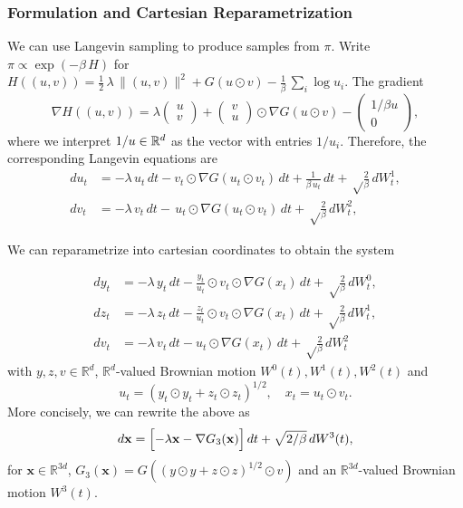\documentclass{article}
\renewcommand{\vec}[1]{{\mathbf{#1}}}
\begin{document}
\subsubsection{Formulation and Cartesian Reparametrization}
We can use Langevin sampling to produce samples from $\pi$. Write $\pi\propto\exp(-\beta\, H)$ for $H((u,v))=\frac 12 \,\lambda\, \|(u,v)\|^2 + G(u\odot v)- \frac{1}{\beta}\,\sum_i\log u_i$. The gradient
\[
\nabla H((u,v))=\lambda\begin{pmatrix}
    u\\v
\end{pmatrix}
+\begin{pmatrix}
    v\\ u
\end{pmatrix}\odot \nabla G(u\odot v)
-\begin{pmatrix}
    1/\beta u\\ 0
\end{pmatrix},
\]
where we interpret $1/u\in\mathbb{R}^d$ as the vector with entries $1/u_i$. Therefore, the corresponding Langevin equations are 
\begin{equation} \label{uvproc}
\begin{split}
du_t&=-\lambda\,   u_t\,dt - v_t\odot \nabla G(u_t\odot v_t)\,dt
 +\frac{1}{\beta \,u_t}\,dt+ \sqrt\frac{2}{\beta}\,dW^1_t,\\
dv_t&=-\lambda\,  v_t\,dt -  \,u_t \odot \nabla G(u_t\odot v_t)\,dt+  \sqrt\frac{2}{\beta}\,dW^2_t,
\label{uvproc}
\end{split}
\end{equation}

We can reparametrize into cartesian coordinates to obtain the system

\begin{equation} 
\begin{split} 
dy_t&=-\lambda\,   y_t\,dt - \frac{y_t}{u_t} \odot v_t\odot \nabla G(x_t)\,dt
 +\sqrt\frac{2}{\beta}\,dW^0_t,\\
dz_t&=-\lambda\,   z_t\,dt - \frac{z_t}{u_t} \odot v_t\odot \nabla G(x_t)\,dt
 +\sqrt\frac{2}{\beta}\,dW^1_t,\\
dv_t&=-\lambda\,   v_t\,dt - u_t\odot \nabla G(x_t)\,dt
 +\sqrt\frac{2}{\beta}\,dW^2_t
\label{yzvproc}
\end{split}
\end{equation}
with $y,z,v \in \mathbb{R}^d$, $\mathbb{R}^{d}$-valued Brownian motion $W^0(t), W^1(t), W^2(t)$ and
\[u_t = (y_t \odot y_t + z_t \odot z_t)^{1/2}, \quad x_t = u_t \odot v_t.\]
More concisely, we can rewrite the above as 
\begin{equation}  
 \begin{aligned}
 d\vec x= \Bigl[-\lambda \vec x - \nabla G_{3}(\vec x)\Bigr]\,dt +\sqrt{2/\beta}\, dW^3(t),
  \end{aligned}\label{cyl}
\end{equation}
for $\vec x \in \mathbb{R}^{3d}$, $G_{3}(\vec x)= G( (y\odot y + z\odot z)^{1/2} \odot v)$ and an $\mathbb{R}^{3d}$-valued Brownian motion $W^3(t)$. 
\end{document}
